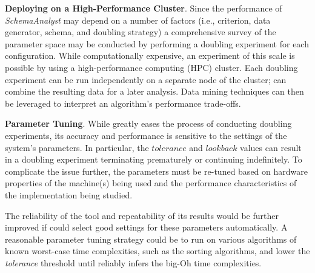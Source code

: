 

{\bf Deploying on a High-Performance Cluster}.  Since the performance of
\textit{SchemaAnalyst} may depend on a number of factors (i.e., criterion, data
generator, schema, and doubling strategy) a comprehensive survey of the
parameter space may be conducted by performing a doubling experiment for each
configuration. While computationally expensive, an experiment of this scale is
possible by using a high-performance computing (HPC) cluster. Each doubling
experiment can be run independently on a separate node of the cluster;
\toolname can combine the resulting data for a later analysis. Data mining techniques
can then be leveraged to interpret an algorithm's performance trade-offs.

 {\bf Parameter Tuning}.  While \toolname greatly eases the process of
 conducting doubling experiments, its accuracy and performance is sensitive to
 the settings of the system's parameters.  In particular, the
 $\mathit{tolerance}$ and $\mathit{lookback}$ values can result in a doubling
 experiment terminating prematurely or continuing indefinitely.  To complicate
 the issue further, the parameters must be re-tuned based on hardware
 properties of the machine(s) being used and the performance characteristics of
 the implementation being studied.

  The reliability of the tool and repeatability of its results would be further
  improved if \toolname could select good settings for these parameters
  automatically. A reasonable parameter tuning strategy could be to run
  \toolname on various algorithms of known worst-case time complexities, such
  as the sorting algorithms, and lower the \textit{tolerance} threshold until
  \toolname reliably infers the big-Oh time complexities.

